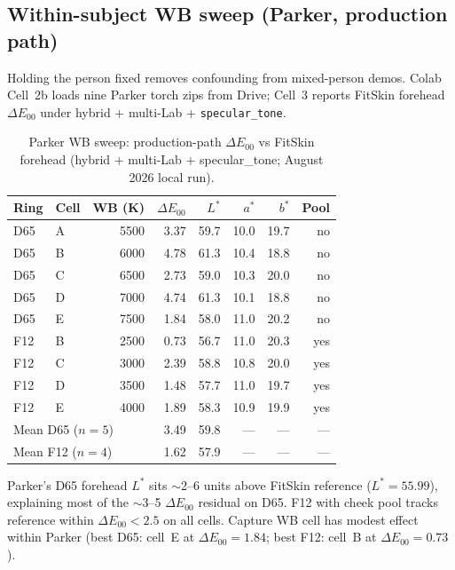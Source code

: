 \documentclass[11pt]{article}
\newcommand{\deee}{\ensuremath{\Delta E_{00}}}
\begin{document}
\subsection{Within-subject WB sweep (Parker, production path)}
\label{sec:parker-sweep}
Holding the person fixed removes confounding from mixed-person demos.
Colab Cell~2b loads nine Parker torch zips from Drive; Cell~3 reports FitSkin
forehead $\deee$ under hybrid + multi-Lab + \texttt{specular\_tone}.

\begin{table}[h]
\centering
\caption{Parker WB sweep: production-path $\deee$ vs FitSkin forehead
(hybrid + multi-Lab + specular\_tone; August 2026 local run).}
\label{tab:parker-sweep}
\begin{tabular}{llrrrrrr}
\toprule
Ring & Cell & WB (K) & $\deee$ & $L^*$ & $a^*$ & $b^*$ & Pool \\
\midrule
D65 & A & 5500 & 3.37 & 59.7 & 10.0 & 19.7 & no \\
D65 & B & 6000 & 4.78 & 61.3 & 10.4 & 18.8 & no \\
D65 & C & 6500 & 2.73 & 59.0 & 10.3 & 20.0 & no \\
D65 & D & 7000 & 4.74 & 61.3 & 10.1 & 18.8 & no \\
D65 & E & 7500 & 1.84 & 58.0 & 11.0 & 20.2 & no \\
\midrule
F12 & B & 2500 & 0.73 & 56.7 & 11.0 & 20.3 & yes \\
F12 & C & 3000 & 2.39 & 58.8 & 10.8 & 20.0 & yes \\
F12 & D & 3500 & 1.48 & 57.7 & 11.0 & 19.7 & yes \\
F12 & E & 4000 & 1.89 & 58.3 & 10.9 & 19.9 & yes \\
\midrule
\multicolumn{3}{l}{Mean D65 ($n=5$)} & 3.49 & 59.8 & --- & --- & --- \\
\multicolumn{3}{l}{Mean F12 ($n=4$)} & 1.62 & 57.9 & --- & --- & --- \\
\bottomrule
\end{tabular}
\end{table}

Parker's D65 forehead $L^*$ sits $\sim$2--6 units above FitSkin reference
($L^*=55.99$), explaining most of the $\sim$3--5 $\deee$ residual on D65.
F12 with cheek pool tracks reference within $\deee<2.5$ on all cells.
Capture WB cell has modest effect within Parker (best D65: cell~E at $\deee=1.84$;
best F12: cell~B at $\deee=0.73$).
\end{document}
